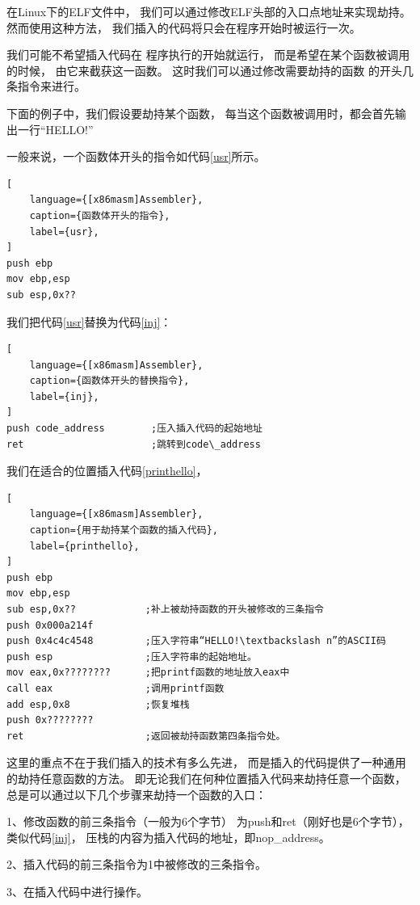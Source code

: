在Linux下的ELF文件中，
我们可以通过修改ELF头部的入口点地址来实现劫持。
然而使用这种方法，
我们插入的代码将只会在程序开始时被运行一次。

我们可能不希望插入代码在
程序执行的开始就运行，
而是希望在某个函数被调用的时候，
由它来截获这一函数。
这时我们可以通过修改需要劫持的函数
的开头几条指令来进行。

下面的例子中，我们假设要劫持某个函数，
每当这个函数被调用时，都会首先输出一行“HELLO!”


一般来说，一个函数体开头的指令如代码\ref{usr}所示。

\begin{lstlisting}[
    language={[x86masm]Assembler},
    caption={函数体开头的指令},
    label={usr},
]
push ebp          
mov ebp,esp       
sub esp,0x??               
\end{lstlisting}

我们把代码\ref{usr}替换为代码\ref{inj}：

\begin{lstlisting}[
    language={[x86masm]Assembler},
    caption={函数体开头的替换指令},
    label={inj},
]
push code_address        ;压入插入代码的起始地址
ret                      ;跳转到code\_address
\end{lstlisting}


我们在适合的位置插入代码\ref{printhello}，
\begin{lstlisting}[
    language={[x86masm]Assembler},
    caption={用于劫持某个函数的插入代码},
    label={printhello},
]
push ebp
mov ebp,esp
sub esp,0x??            ;补上被劫持函数的开头被修改的三条指令
push 0x000a214f
push 0x4c4c4548         ;压入字符串“HELLO!\textbackslash n”的ASCII码
push esp                ;压入字符串的起始地址。  
mov eax,0x????????      ;把printf函数的地址放入eax中
call eax                ;调用printf函数
add esp,0x8             ;恢复堆栈
push 0x????????        
ret                     ;返回被劫持函数第四条指令处。
\end{lstlisting}

这里的重点不在于我们插入的技术有多么先进，
而是插入的代码提供了一种通用的劫持任意函数的方法。
即无论我们在何种位置插入代码来劫持任意一个函数，
总是可以通过以下几个步骤来劫持一个函数的入口：

1、修改函数的前三条指令（一般为6个字节）
为push和ret（刚好也是6个字节），类似代码\ref{inj}，
压栈的内容为插入代码的地址，即nop\_address。

2、插入代码的前三条指令为1中被修改的三条指令。

3、在插入代码中进行操作。

